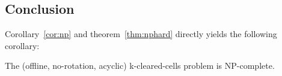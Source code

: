 \subsection{Conclusion}

Corollary~\ref{cor:np} and theorem~\ref{thm:nphard} directly yields the following corollary: \\

\begin{cor}
The (offline, no-rotation, acyclic) k-cleared-cells problem is NP-complete.
\end{cor}
